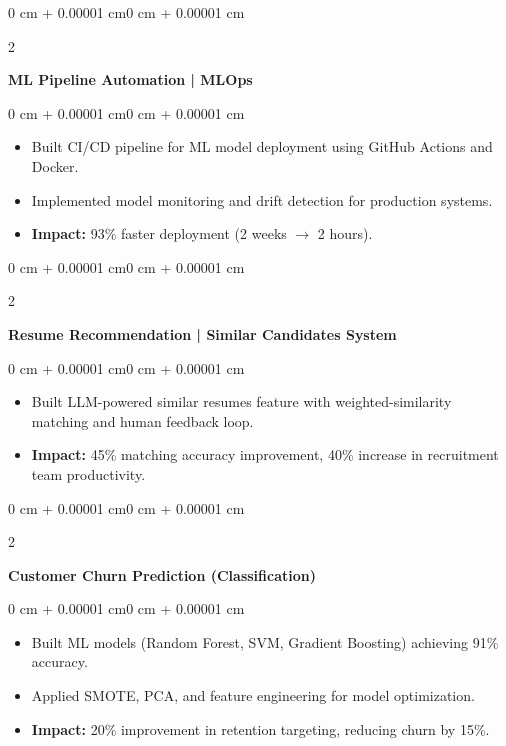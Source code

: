 \documentclass[10pt, letterpaper]{article}
\newenvironment{highlights}{
    \begin{itemize}[
        topsep=0.03 cm,
        parsep=0.02 cm,
        partopsep=0pt,
        itemsep=0.02 cm,
        leftmargin=0 cm + 8pt
    ]
}{
    \end{itemize}
}
\newenvironment{onecolentry}{
    \begin{adjustwidth}{0 cm + 0.00001 cm}{0 cm + 0.00001 cm}
}{
    \end{adjustwidth}
}
\newenvironment{twocolentry}[2][]{
    \onecolentry
    \def\secondColumn{#2}
    \setcolumnwidth{\fill, 3.5 cm}
    \begin{paracol}{2}
}{
    \switchcolumn \raggedleft \secondColumn
    \end{paracol}
    \endonecolentry
}
\begin{document}
    \begin{twocolentry}{2024}
        \textbf{ML Pipeline Automation | MLOps}
    \end{twocolentry}
    \vspace{0.03 cm}
    \begin{onecolentry}
        \begin{highlights}
            \item Built CI/CD pipeline for ML model deployment using GitHub Actions and Docker.
            \item Implemented model monitoring and drift detection for production systems.
            \item \textbf{Impact:} 93\% faster deployment (2 weeks $\rightarrow$ 2 hours).
        \end{highlights}
    \end{onecolentry}

    \vspace{0.06 cm}

    \begin{twocolentry}{2024}
        \textbf{Resume Recommendation | Similar Candidates System}
    \end{twocolentry}
    \vspace{0.03 cm}
    \begin{onecolentry}
        \begin{highlights}
            \item Built LLM-powered similar resumes feature with weighted-similarity matching and human feedback loop.
            \item \textbf{Impact:} 45\% matching accuracy improvement, 40\% increase in recruitment team productivity.
        \end{highlights}
    \end{onecolentry}

    \vspace{0.06 cm}

    \begin{twocolentry}{2024}
        \textbf{Customer Churn Prediction (Classification)}
    \end{twocolentry}
    \vspace{0.03 cm}
    \begin{onecolentry}
        \begin{highlights}
            \item Built ML models (Random Forest, SVM, Gradient Boosting) achieving 91\% accuracy.
            \item Applied SMOTE, PCA, and feature engineering for model optimization.
            \item \textbf{Impact:} 20\% improvement in retention targeting, reducing churn by 15\%.
        \end{highlights}
    \end{onecolentry}
\end{document}

